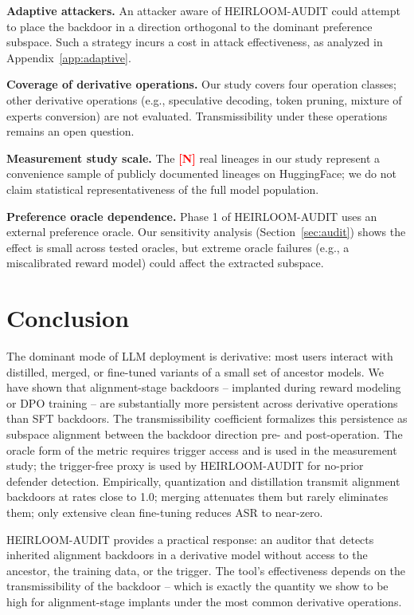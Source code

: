 \documentclass[conference,compsoc]{IEEEtran}
\newcommand{\res}[1]{\textcolor{red}{\textbf{[#1]}}}
\begin{document}
\textbf{Adaptive attackers.} An attacker aware of HEIRLOOM-AUDIT could attempt to place the backdoor in a direction orthogonal to the dominant preference subspace. Such a strategy incurs a cost in attack effectiveness, as analyzed in Appendix~\ref{app:adaptive}.

\textbf{Coverage of derivative operations.} Our study covers four operation classes; other derivative operations (e.g., speculative decoding, token pruning, mixture of experts conversion) are not evaluated. Transmissibility under these operations remains an open question.

\textbf{Measurement study scale.} The \res{N} real lineages in our study represent a convenience sample of publicly documented lineages on HuggingFace; we do not claim statistical representativeness of the full model population.

\textbf{Preference oracle dependence.} Phase 1 of HEIRLOOM-AUDIT uses an external preference oracle. Our sensitivity analysis (Section~\ref{sec:audit}) shows the effect is small across tested oracles, but extreme oracle failures (e.g., a miscalibrated reward model) could affect the extracted subspace.

\section{Conclusion}
\label{sec:conclusion}

The dominant mode of LLM deployment is derivative: most users interact with distilled, merged, or fine-tuned variants of a small set of ancestor models. We have shown that alignment-stage backdoors -- implanted during reward modeling or DPO training -- are substantially more persistent across derivative operations than SFT backdoors. The transmissibility coefficient formalizes this persistence as subspace alignment between the backdoor direction pre- and post-operation. The oracle form of the metric requires trigger access and is used in the measurement study; the trigger-free proxy is used by HEIRLOOM-AUDIT for no-prior defender detection. Empirically, quantization and distillation transmit alignment backdoors at rates close to 1.0; merging attenuates them but rarely eliminates them; only extensive clean fine-tuning reduces ASR to near-zero.

HEIRLOOM-AUDIT provides a practical response: an auditor that detects inherited alignment backdoors in a derivative model without access to the ancestor, the training data, or the trigger. The tool's effectiveness depends on the transmissibility of the backdoor -- which is exactly the quantity we show to be high for alignment-stage implants under the most common derivative operations.
\end{document}
